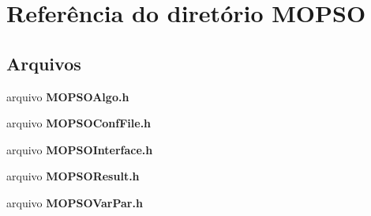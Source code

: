 \section{Referência do diretório M\+O\+P\+SO}
\label{dir_222e9ed34fb2554a9e87dc9c373003c7}
\subsection*{Arquivos}
\begin{DoxyCompactItemize}
\item 
arquivo {\bf M\+O\+P\+S\+O\+Algo.\+h}
\item 
arquivo {\bf M\+O\+P\+S\+O\+Conf\+File.\+h}
\item 
arquivo {\bf M\+O\+P\+S\+O\+Interface.\+h}
\item 
arquivo {\bf M\+O\+P\+S\+O\+Result.\+h}
\item 
arquivo {\bf M\+O\+P\+S\+O\+Var\+Par.\+h}
\end{DoxyCompactItemize}
